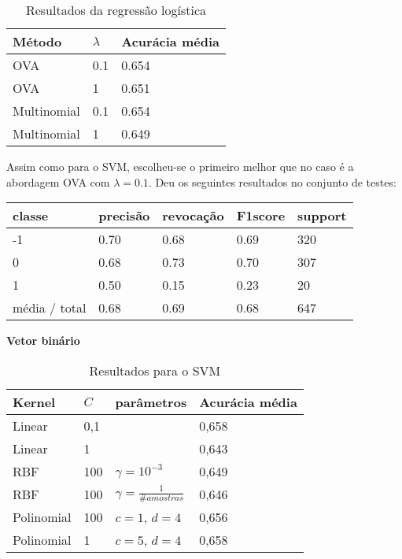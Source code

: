 \begin{table}[H]
	\centering
	\caption{Resultados da regressão logística}
	\begin{tabular}{l l l}
		\hline
		Método & $\lambda$ & Acurácia média \\
		\hline
		OVA & 0.1 & 0.654 \\
		\hline
		OVA & 1 & 0.651 \\
		\hline
		Multinomial & 0.1 & 0.654 \\
		\hline
		Multinomial & 1 & 0.649 \\
		\hline
	\end{tabular}
\end{table}

Assim como para o SVM, escolheu-se o primeiro melhor que no caso é a abordagem OVA com $\lambda = 0.1$.
Deu os seguintes resultados no conjunto de testes:

\begin{table}[H]
	\centering
		\begin{tabular}{l | l | l | l | l}
		\hline
		classe  	&	precisão  &  revocação &  F1\-score &  support \\
		\hline
         -1   &    0.70  &    0.68   &   0.69   &    320 \\
         \hline
          0    &   0.68   &   0.73   &   0.70   &    307 \\
          \hline
          1    &   0.50   &   0.15   &   0.23   &     20 \\
		\hline
		média / total  &     0.68  &    0.69    &  0.68   &    647 \\
		\hline
	\end{tabular}
\end{table}

\textbf{Vetor binário}

\begin{table}[H]
	\centering
	\caption{Resultados para o SVM}
	\begin{tabular}{l l l l}
		\hline
		Kernel & $C$ & parâmetros & Acurácia média \\
		\hline
		Linear & 0,1 & & 0,658 \\
		\hline
		Linear & 1 & & 0,643 \\
		\hline
		RBF & 100 & $\gamma = 10^{-3}$ & 0,649 \\
		\hline
		RBF & 100 & $\gamma = \frac{1}{\# amostras}$ & 0,646 \\
		\hline
		Polinomial & 100 & $c = 1$, $d = 4$ & 0,656 \\
		\hline
		Polinomial & 1 & $c = 5$, $d = 4$ & 0,658 \\
		\hline
	\end{tabular}
\end{table}


